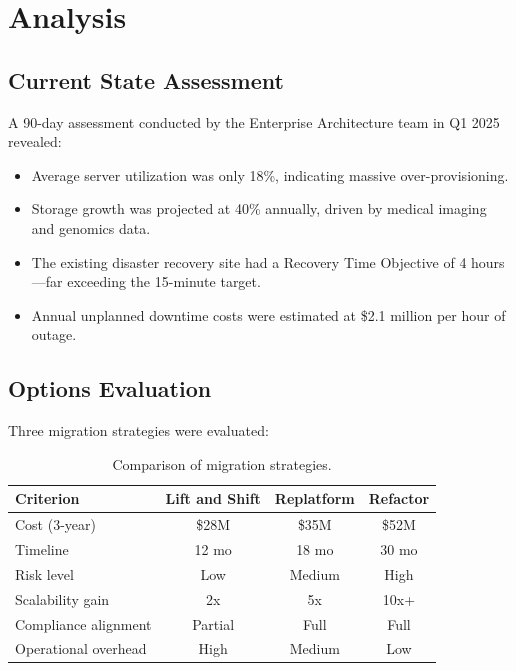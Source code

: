 \documentclass[
    language=english,
    doctype=article,
    institution=none,
]{../../omnilatex}
\begin{document}
\section{Analysis}

\subsection{Current State Assessment}

A 90-day assessment conducted by the Enterprise Architecture team in Q1
2025 revealed:

\begin{itemize}
    \item Average server utilization was only 18\%, indicating massive
        over-provisioning.
    \item Storage growth was projected at 40\% annually, driven by
        medical imaging and genomics data.
    \item The existing disaster recovery site had a Recovery Time Objective
        of 4 hours---far exceeding the 15-minute target.
    \item Annual unplanned downtime costs were estimated at \$2.1 million
        per hour of outage.
\end{itemize}

\subsection{Options Evaluation}

Three migration strategies were evaluated:

\begin{table}[h]
    \centering
    \begin{tabular}{lccc}
        \toprule
        \textbf{Criterion} & \textbf{Lift and Shift} & \textbf{Replatform} & \textbf{Refactor} \\
        \midrule
        Cost (3-year)        & \$28M  & \$35M  & \$52M \\
        Timeline             & 12 mo  & 18 mo  & 30 mo \\
        Risk level           & Low    & Medium & High \\
        Scalability gain     & 2x     & 5x     & 10x+ \\
        Compliance alignment & Partial & Full   & Full \\
        Operational overhead & High   & Medium & Low \\
        \bottomrule
    \end{tabular}
    \caption{Comparison of migration strategies.}
\end{table}
\end{document}

